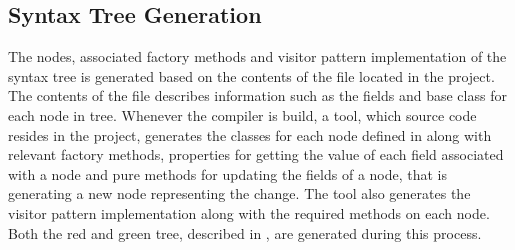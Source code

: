\subsection{Syntax Tree Generation}
\label{subsec:roslyn_syntax_tree_generation}
The nodes, associated factory methods and visitor pattern implementation of the syntax tree is generated based on the contents of the  file located in the  project. The contents of the file describes information such as the fields and base class for each node in tree. Whenever the compiler is build, a tool, which source code resides in the  project, generates the classes for each node defined in  along with relevant factory methods, properties for getting the value of each field associated with a node and pure methods for updating the fields of a node, that is generating a new node representing the change. The tool also generates the visitor pattern implementation along with the required  methods on each node. Both the red and green tree, described in , are generated during this process.




	
	


